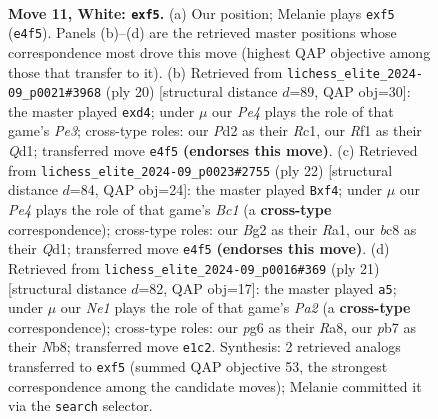 \documentclass[11pt]{article}
\begin{document}
\clearpage

\begin{figure}[p]\centering
\begin{subfigure}{0.46\textwidth}\centering
\resizebox{\linewidth}{!}{%
\newchessgame
\chessboard[
  setfen={r1bqnr1k/pp1pppbp/6p1/2p2n2/2P1P3/2N3P1/PP1P1PBP/R1BQNRK1 w - - 1 11},
  showmover=false,
  pgfstyle=straightmove, color=movearrow, markmove={e4-f5}
]}
\caption{}
\end{subfigure}\hfill
\begin{subfigure}{0.46\textwidth}\centering
\resizebox{\linewidth}{!}{%
\newchessgame
\chessboard[
  setfen={1k1r1b1r/ppp1nppp/4q3/4pb2/1P1n4/P1N1PN2/1B1P1PPP/2RQKB1R w K - 7 11},
  showmover=false,
  pgfstyle=straightmove, color=movearrow, markmove={e3-d4}
]}
\caption{}
\end{subfigure}
\\[4pt]
\begin{subfigure}{0.46\textwidth}\centering
\resizebox{\linewidth}{!}{%
\newchessgame
\chessboard[
  setfen={r3kb1r/pbqn1ppp/1p2p3/8/3PNn2/2PB1N2/PP3PPP/R1BQ1RK1 w kq - 1 12},
  showmover=false,
  pgfstyle=straightmove, color=movearrow, markmove={c1-f4}
]}
\caption{}
\end{subfigure}\hfill
\begin{subfigure}{0.46\textwidth}\centering
\resizebox{\linewidth}{!}{%
\newchessgame
\chessboard[
  setfen={rn1q1rk1/pp2ppbp/2pn2p1/5b2/P1NP4/2Q2NP1/1P2PPBP/R1B2RK1 b - - 2 11},
  showmover=false,
  pgfstyle=straightmove, color=movearrow, markmove={a7-a5}
]}
\caption{}
\end{subfigure}
\caption{\textbf{Move 11, White: \texttt{exf5}.} (a) Our position; Melanie plays \texttt{exf5} (\texttt{e4f5}). Panels (b)--(d) are the retrieved master positions whose correspondence most drove this move (highest QAP objective among those that transfer to it). (b) Retrieved from \texttt{lichess\_elite\_2024-09\_p0021\#3968} (ply 20) [structural distance $d$=89, QAP obj=30]: the master played \texttt{exd4}; under $\mu$ our \emph{Pe4} plays the role of that game's \emph{Pe3}; cross-type roles: our \emph{P}d2 as their \emph{R}c1, our \emph{R}f1 as their \emph{Q}d1; transferred move \texttt{e4f5} \textbf{(endorses this move)}. (c) Retrieved from \texttt{lichess\_elite\_2024-09\_p0023\#2755} (ply 22) [structural distance $d$=84, QAP obj=24]: the master played \texttt{Bxf4}; under $\mu$ our \emph{Pe4} plays the role of that game's \emph{Bc1} (a \textbf{cross-type} correspondence); cross-type roles: our \emph{B}g2 as their \emph{R}a1, our \emph{b}c8 as their \emph{Q}d1; transferred move \texttt{e4f5} \textbf{(endorses this move)}. (d) Retrieved from \texttt{lichess\_elite\_2024-09\_p0016\#369} (ply 21) [structural distance $d$=82, QAP obj=17]: the master played \texttt{a5}; under $\mu$ our \emph{Ne1} plays the role of that game's \emph{Pa2} (a \textbf{cross-type} correspondence); cross-type roles: our \emph{p}g6 as their \emph{R}a8, our \emph{p}b7 as their \emph{N}b8; transferred move \texttt{e1c2}. Synthesis: 2 retrieved analogs transferred to \texttt{exf5} (summed QAP objective 53, the strongest correspondence among the candidate moves); Melanie committed it via the \texttt{search} selector.}
\label{fig:thought-m20}
\end{figure}
\end{document}
